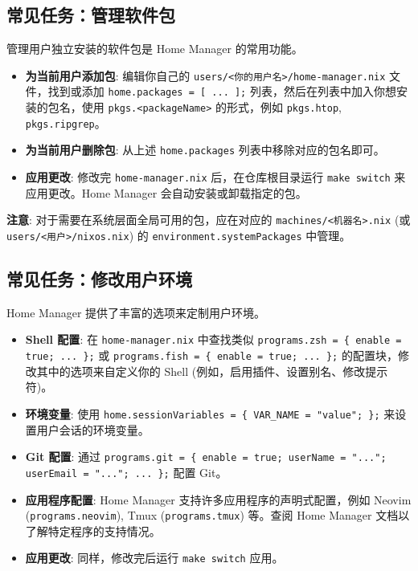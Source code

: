 \documentclass[11pt, a4paper]{article} %
\begin{document}
\subsection{常见任务：管理软件包}
管理用户独立安装的软件包是 Home Manager 的常用功能。
\begin{itemize}[leftmargin=*]
    \item \textbf{为当前用户添加包}: 编辑你自己的 \texttt{users/<你的用户名>/home-manager.nix} 文件，找到或添加 \texttt{home.packages = [ ... ];} 列表，然后在列表中加入你想安装的包名，使用 \texttt{pkgs.<packageName>} 的形式，例如 \texttt{pkgs.htop}, \texttt{pkgs.ripgrep}。
    \item \textbf{为当前用户删除包}: 从上述 \texttt{home.packages} 列表中移除对应的包名即可。
    \item \textbf{应用更改}: 修改完 \texttt{home-manager.nix} 后，在仓库根目录运行 \texttt{make switch} 来应用更改。Home Manager 会自动安装或卸载指定的包。
\end{itemize}
\textbf{注意}: 对于需要在系统层面全局可用的包，应在对应的 \texttt{machines/<机器名>.nix} (或 \texttt{users/<用户>/nixos.nix}) 的 \texttt{environment.systemPackages} 中管理。

\subsection{常见任务：修改用户环境}
Home Manager 提供了丰富的选项来定制用户环境。
\begin{itemize}[leftmargin=*]
    \item \textbf{Shell 配置}: 在 \texttt{home-manager.nix} 中查找类似 \texttt{programs.zsh = \{ enable = true; ... \};} 或 \texttt{programs.fish = \{ enable = true; ... \};} 的配置块，修改其中的选项来自定义你的 Shell (例如，启用插件、设置别名、修改提示符)。
    \item \textbf{环境变量}: 使用 \texttt{home.sessionVariables = \{ VAR\_NAME = "value"; \};} 来设置用户会话的环境变量。
    \item \textbf{Git 配置}: 通过 \texttt{programs.git = \{ enable = true; userName = "..."; userEmail = "..."; ... \};} 配置 Git。
    \item \textbf{应用程序配置}: Home Manager 支持许多应用程序的声明式配置，例如 Neovim (\texttt{programs.neovim}), Tmux (\texttt{programs.tmux}) 等。查阅 Home Manager 文档以了解特定程序的支持情况。
    \item \textbf{应用更改}: 同样，修改完后运行 \texttt{make switch} 应用。
\end{itemize}
\end{document}
